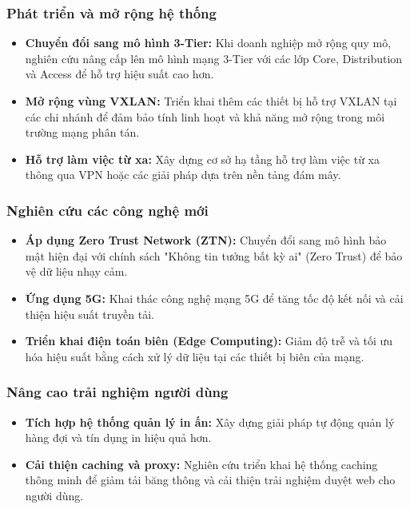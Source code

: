 \documentclass[13pt]{article}
\begin{document}
\subsubsection{Phát triển và mở rộng hệ thống}
\begin{itemize}
    \item \textbf{Chuyển đổi sang mô hình 3-Tier: }Khi doanh nghiệp mở rộng quy mô, nghiên cứu nâng cấp lên mô hình mạng 3-Tier với các lớp Core, Distribution và Access để hỗ trợ hiệu suất cao hơn.
    \item \textbf{Mở rộng vùng VXLAN: }Triển khai thêm các thiết bị hỗ trợ VXLAN tại các chi nhánh để đảm bảo tính linh hoạt và khả năng mở rộng trong môi trường mạng phân tán.
    \item \textbf{Hỗ trợ làm việc từ xa: }Xây dựng cơ sở hạ tầng hỗ trợ làm việc từ xa thông qua VPN hoặc các giải pháp dựa trên nền tảng đám mây.
\end{itemize}

\subsubsection{Nghiên cứu các công nghệ mới}
\begin{itemize}
    \item \textbf{Áp dụng Zero Trust Network (ZTN): }Chuyển đổi sang mô hình bảo mật hiện đại với chính sách "Không tin tưởng bất kỳ ai" (Zero Trust) để bảo vệ dữ liệu nhạy cảm.
    \item \textbf{Ứng dụng 5G: }Khai thác công nghệ mạng 5G để tăng tốc độ kết nối và cải thiện hiệu suất truyền tải.
    \item \textbf{Triển khai điện toán biên (Edge Computing): }Giảm độ trễ và tối ưu hóa hiệu suất bằng cách xử lý dữ liệu tại các thiết bị biên của mạng.
\end{itemize}

\subsubsection{Nâng cao trải nghiệm người dùng}
\begin{itemize}
    \item \textbf{Tích hợp hệ thống quản lý in ấn: }Xây dựng giải pháp tự động quản lý hàng đợi và tín dụng in hiệu quả hơn.
    \item \textbf{Cải thiện caching và proxy: }Nghiên cứu triển khai hệ thống caching thông minh để giảm tải băng thông và cải thiện trải nghiệm duyệt web cho người dùng.
\end{itemize}
\end{document}
